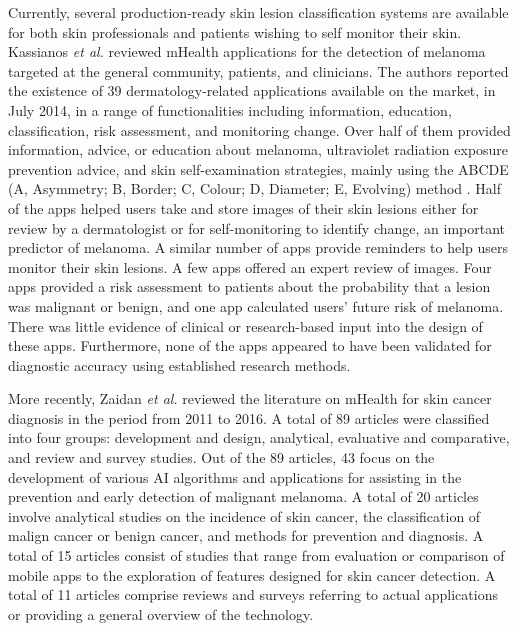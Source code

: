     Currently, several production-ready skin lesion classification systems are available for both skin professionals and patients wishing to self monitor their skin. Kassianos \textit{et al.} \cite{Kassianos2015} reviewed mHealth applications for the detection of melanoma targeted at the general community, patients, and clinicians. The authors reported the existence of 39 dermatology-related applications available on the market, in July 2014, in a range of functionalities including information, education, classification, risk assessment, and monitoring change. Over half of them provided information, advice, or education about melanoma, ultraviolet radiation exposure prevention advice, and skin self-examination strategies, mainly using the ABCDE (A, Asymmetry; B, Border; C, Colour; D, Diameter; E, Evolving) method \cite{Nachbar1994}. Half of the apps helped users take and store images of their skin lesions either for review by a dermatologist or for self-monitoring to identify change, an important predictor of melanoma. A similar number of apps provide reminders to help users monitor their skin lesions. A few apps offered an expert review of images. Four apps provided a risk assessment to patients about the probability that a lesion was malignant or benign, and one app calculated users’ future risk of melanoma. There was little evidence of clinical or research-based input into the design of these apps. Furthermore, none of the apps appeared to have been validated for diagnostic accuracy using established research methods. \par
    
    More recently, Zaidan \textit{et al.} \cite{Zaidan2018} reviewed the literature on mHealth for skin cancer diagnosis in the period from 2011 to 2016. A total of 89 articles were classified into four groups: development and design, analytical, evaluative and comparative, and review and survey studies. Out of the 89 articles, 43 focus on the development of various AI algorithms and applications for assisting in the prevention and early detection of malignant melanoma. A total of 20 articles involve analytical studies on the incidence of skin cancer, the classification of malign cancer or benign cancer, and methods for prevention and diagnosis. A total of 15 articles consist of studies that range from evaluation or comparison of mobile apps to the exploration of features designed for skin cancer detection. A total of 11 articles comprise reviews and surveys referring to actual applications or providing a general overview of the technology. \par
    
